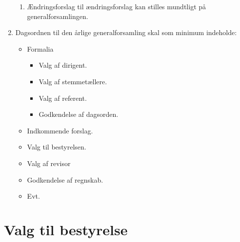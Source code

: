 \documentclass[a4paper]{article}
\newenvironment{stykenum}{
  \begin{enumerate}[%
    label=Stk.~\arabic*., ref=\theenumi~Stk.~\arabic*, start=2]
}{\end{enumerate}}
\begin{document}
\begin{enumerate}[resume*=afsnit]
\begin{stykenum}
  \item Ændringsforslag til ændringsforslag kan stilles mundtligt på
        generalforsamlingen.

  \end{stykenum}

\item Dagsordnen til den årlige generalforsamling skal som minimum indeholde:

  \begin{itemize}
  \item Formalia
    \begin{itemize}
    \item Valg af dirigent.
    \item Valg af stemmetællere.
    \item Valg af referent.
    \item Godkendelse af dagsorden.
    \end{itemize}
  \item Indkommende forslag.
  \item Valg til bestyrelsen.
  \item Valg af revisor
  \item Godkendelse af regnskab.
  \item Evt.
  \end{itemize}

\end{enumerate}

\section*{Valg til bestyrelse}
\end{document}
